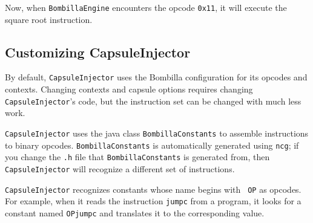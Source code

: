 \documentclass[10pt]{article}
\newcommand{\bomb}{Bombilla\xspace}
\begin{document}
Now, when {\tt BombillaEngine} encounters the opcode {\tt 0x11}, it
will execute the square root instruction.

\subsection{Customizing CapsuleInjector}

By default, {\tt CapsuleInjector} uses the \bomb configuration for its
opcodes and contexts. Changing contexts and capsule options requires
changing {\tt CapsuleInjector}'s code, but the instruction set can be
changed with much less work.

{\tt CapsuleInjector} uses the java class {\tt BombillaConstants} to
assemble instructions to binary opcodes. {\tt BombillaConstants} is
automatically generated using {\tt ncg}; if you change the {\tt .h}
file that {\tt BombillaConstants} is generated from, then {\tt
CapsuleInjector} will recognize a different set of instructions.

{\tt CapsuleInjector} recognizes constants whose name begins with {\tt
OP} as opcodes. For example, when it reads the instruction {\tt jumpc}
from a program, it looks for a constant named {\tt OPjumpc} and
translates it to the corresponding value.
\end{document}
